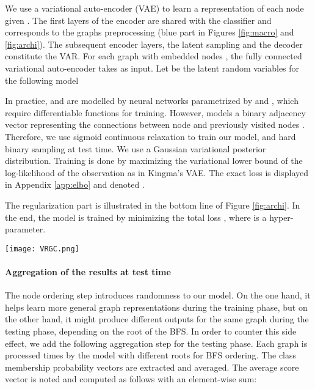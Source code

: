 \documentclass{article} \usepackage{iclr2019_conference}
\newcommand{\cmmnt}[1]{}
\begin{document}
We use a variational auto-encoder (VAE) \citep{kingma2013auto} to learn a representation of each node  given . The first layers of the encoder are shared with the classifier and corresponds to the graphs preprocessing (blue part in Figures \ref{fig:macro} and \ref{fig:archi}). The subsequent encoder layers, the latent sampling and the decoder constitute the VAR. For each graph  with embedded nodes , the fully connected variational auto-encoder takes  as input. Let  be the latent random variables for the following model 

 

In practice,  and  are modelled by neural networks parametrized by  and , which require differentiable functions for training. However,  models a binary adjacency vector representing the connections between node  and previously visited nodes . Therefore, we use sigmoid continuous relaxation to train our model, and hard binary sampling at test time. We use a Gaussian variational posterior distribution. Training is done by maximizing the variational lower bound of the log-likelihood of the observation as in Kingma's VAE. The exact loss is displayed in Appendix \ref{app:elbo} and denoted . 

The regularization part is illustrated in the bottom line of Figure \ref{fig:archi}. In the end, the model is trained by minimizing the total loss , where  is a hyper-parameter.


\begin{figure*}
    \centering
    \texttt{[image: VRGC.png]}
    \caption{Architecture for VRGC. Top: node ordering and embedding. Middle: classification. Bottom: regularization with VAR plus final aggregation. FC stands for fully-connected.}
    \label{fig:archi}
\end{figure*}

\paragraph{Aggregation of the results at test time}
\label{sub:aggreg}

The node ordering step introduces randomness to our model. On the one hand, it helps learn more general graph representations during the training phase, but on the other hand, it might produce different outputs for the same graph during the testing phase, depending on the root of the BFS. In order to counter this side effect, we add the following aggregation step for the testing phase\cmmnt{ combining a soft and a hard vote}. Each graph is processed  times by the model with  different roots for BFS ordering. The  class membership probability vectors are extracted and averaged. The average score vector is noted  and computed as follows with an element-wise sum: 
\end{document}
